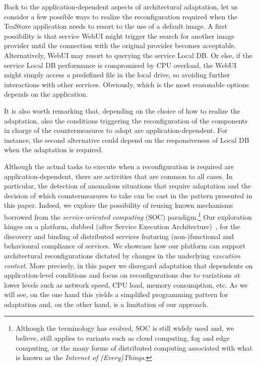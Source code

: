 Back to the application-dependent aspects of architectural adaptation,
let us consider a few possible ways to realize the reconfiguration
required when the TeaStore application needs to resort to the use of a
default image.
%
A first possibility is that service \textsf{WebUI} might trigger the search
for another image provider until the connection with the original
provider becomes acceptable.
% 
Alternatively, \textsf{WebUI} may resort to querying the service \textsf{Local DB}.
%
Or else, if the service \textsf{Local DB} performance is compromised by CPU overload, the \textsf{WebUI} might simply access a predefined file in the local drive, so avoiding further interactions with other services.
%
Obviously, which is the most reasonable options depends on the
application.

It is also worth remarking that, depending on the choice of how to
realize the adaptation, also the conditions triggering the
reconfiguration of the components in charge of the countermeasures to
adopt are application-dependent.
%
For instance, the second alternative could depend on the
responsiveness of \textsf{Local DB} when the adaptation is required.

\medskip

Although the actual tasks to execute when a reconfiguration is
required are application-dependent, there are activities that are
common to all cases.
%
In particular, the detection of anomalous situations that require
adaptation and the decision of which countermeasures to take can be
cast in the pattern presented in this paper.
%
Indeed, we explore the possibility of reusing known
mechanisms borrowed from the \emph{service-oriented computing} (SOC)
paradigm.\footnote{%
  Although the terminology has evolved, SOC is still widely used and,
  we believe, still applies to variants such as cloud computing, fog
  and edge computing, or the many forms of distributed computing
  associated with what is known as the \emph{Internet of (Every)Things}.
}
%
Our exploration hinges on a platform, dubbed \SEArch (after
{\ECFAugie S}ervice {\ECFAugie E}xecution {\ECFAugie
  Arch}itecture)~\cite{lopezpombo:coordination24}, for the discovery
and binding of distributed services featuring (non-)functional and
behavioural compliance of services.
%
We showcase how our platform can support architectural reconfigurations
dictated by  changes in the underlying
\emph{execution context}.
%
More precisely, in this paper we disregard adaptation that dependents on
application-level conditions and focus on reconfigurations due to
variations at lower levels such as network speed, CPU load, memory
consumption, etc.
%
As we will see, on the one hand this yields a simplified programming
pattern for adaptation and, on the other hand, is a limitation of our
approach.

